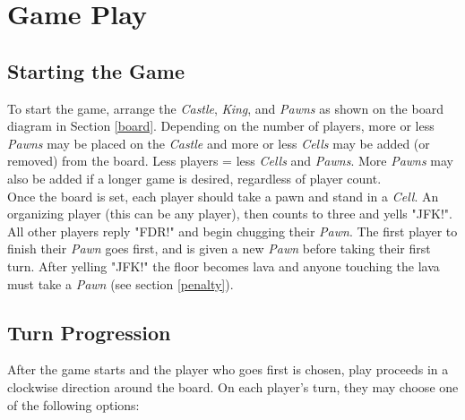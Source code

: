 \documentclass[12pt]{article}
\begin{document}
\section{Game Play} \label{play}

\subsection{Starting the Game}

To start the game, arrange the \textit{Castle}, \textit{King}, and \textit{Pawns} as shown on the board diagram in Section \ref{board}. Depending on the number of players, more or less \textit{Pawns} may be placed on the \textit{Castle} and more or less \textit{Cells} may be added (or removed) from the board. Less players = less \textit{Cells} and \textit{Pawns}. More \textit{Pawns} may also be added if a longer game is desired, regardless of player count. \\

Once the board is set, each player should take a pawn and stand in a \textit{Cell}. An organizing player (this can be any player), then counts to three and yells "JFK!". All other players reply "FDR!" and begin chugging their \textit{Pawn}. The first player to finish their \textit{Pawn} goes first, and is given a new \textit{Pawn} before taking their first turn. After yelling "JFK!" the floor becomes lava and anyone touching the lava must take a \textit{Pawn} (see section \ref{penalty}).\\

\subsection{Turn Progression} \label{progression}

After the game starts and the player who goes first is chosen, play proceeds in a clockwise direction around the board. On each player's turn, they may choose one of the following options: \\
\end{document}
